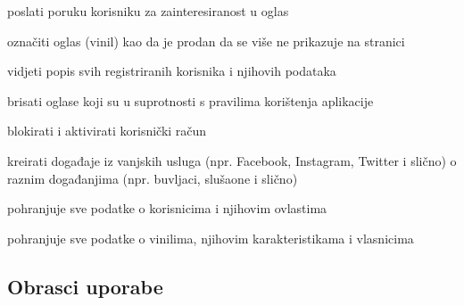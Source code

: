 \begin{packed_enum}
\begin{packed_enum}
\begin{packed_enum}
					\end{packed_enum}
					
					\item poslati poruku korisniku za zainteresiranost u oglas
					\item označiti oglas (vinil) kao da je prodan da se više ne prikazuje na stranici
							
				\end{packed_enum}
				
				\item  {}
				
					\begin{packed_enum}
					
						\item vidjeti popis svih registriranih korisnika i njihovih podataka
						\item brisati oglase koji su u suprotnosti s pravilima korištenja aplikacije
						\item blokirati i aktivirati korisnički račun
						\item kreirati događaje iz vanjskih usluga (npr. Facebook, Instagram, Twitter i slično) o raznim događanjima (npr. buvljaci, slušaone i slično)
						
					\end{packed_enum}
					
				\item  {}
				
					\begin{packed_enum}
					
						\item pohranjuje sve podatke o korisnicima i njihovim ovlastima
						\item pohranjuje sve podatke o vinilima, njihovim karakteristikama i vlasnicima
						
					\end{packed_enum}	
									
				
			\end{packed_enum}
			
			\eject 
			
			
				
			\subsection{Obrasci uporabe}
				
				

